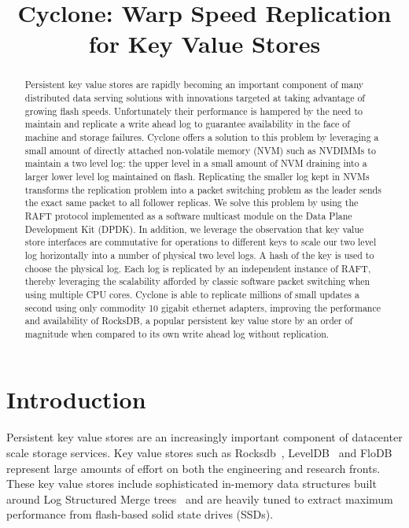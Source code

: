 \documentclass[10pt, preprint, nonatbib]{sigplanconf}
\date{}
\begin{document}
\title{\Large \bf Cyclone: Warp Speed Replication for Key Value Stores}

\maketitle


\begin{abstract}
Persistent key value stores are rapidly becoming an important component of many
distributed data serving solutions with innovations targeted at taking advantage
of growing flash speeds. Unfortunately their performance is hampered by the need
to maintain and replicate a write ahead log to guarantee availability in the
face of machine and storage failures. Cyclone offers a solution to this problem
by leveraging a small amount of directly attached non-volatile memory (NVM) such
as NVDIMMs to maintain a two level log: the upper level in a small amount of NVM
draining into a larger lower level log maintained on flash. Replicating the
smaller log kept in NVMs transforms the replication problem into a packet
switching problem as the leader sends the exact same packet to all follower
replicas. We solve this problem by using the RAFT protocol implemented
as a software multicast module on the Data Plane Development Kit (DPDK). In addition,
we leverage the observation that key value store interfaces are commutative for
operations to different keys to scale our two level log horizontally into a
number of physical two level logs. A hash of the key is used to choose
the physical log. Each log is replicated by an independent instance of RAFT,
thereby leveraging the scalability afforded by classic software packet switching
when using multiple CPU cores. Cyclone is able to replicate millions of small
updates a second using only commodity 10 gigabit ethernet adapters, improving
the performance and availability of RocksDB, a popular persistent key value
store by an order of magnitude when compared to its own write ahead log without
replication.
\end{abstract}

\section{Introduction}
Persistent key value stores are an increasingly important component of
datacenter scale storage services. Key value stores such as
Rocksdb~\cite{rocksdb}, LevelDB~\cite{leveldb} and FloDB~\cite{flodb} represent
large amounts of effort on both the engineering and research fronts. These key
value stores include sophisticated in-memory data structures built around Log
Structured Merge trees~\cite{lsmtree} and are heavily tuned to extract maximum
performance from flash-based solid state drives (SSDs).
\end{document}
